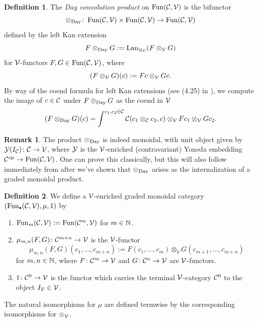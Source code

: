 \documentclass[openany, amssymb, psamsfonts]{amsart}
\theoremstyle{definition}
\newtheorem{defn}{Definition}[section]
\newtheorem{rem}{Remark}[section]
\numberwithin{equation}{section}
\begin{document}
\begin{defn} \label{def:day-conv-prod}
The \emph{Day convolution product} on $\operatorname{Fun}(\mathcal{C}, \mathcal{V})$ is the bifunctor
\begin{equation*}
    \otimes_{\mathrm{Day}} \colon \operatorname{Fun}(\mathcal{C}, \mathcal{V}) \times \operatorname{Fun}(\mathcal{C}, \mathcal{V}) \to \operatorname{Fun}(\mathcal{C}, \mathcal{V})
\end{equation*} defined by the left Kan extension
\begin{equation*}
    F \otimes_{\mathrm{Day}} G := \operatorname{Lan}_{\otimes_{\mathcal{C}}}(F \otimes_{\mathcal{V}} G)
\end{equation*} for $\mathcal{V}$-functors $F, G \in \operatorname{Fun}(\mathcal{C}, \mathcal{V})$, where
\begin{equation*}
    (F \otimes_{\mathcal{V}} G)(c) := Fc \otimes_{\mathcal{V}} Gc.
\end{equation*} By way of the coend formula for left Kan extensions (see (4.25) in \cite{kelly}), we compute the image of $c \in \mathcal{C}$ under $F \otimes_{\mathrm{Day}} G$ as the coend in $\mathcal{V}$
\begin{equation*}
    (F \otimes_{\mathrm{Day}} G)(c) = \int^{c_1, c_2 \in \mathcal{C}} \mathcal{C}(c_1 \otimes_{\mathcal{C}} c_2, c) \otimes_{\mathcal{V}} Fc_1 \otimes_{\mathcal{V}} Gc_2.
\end{equation*}
\end{defn}

\begin{rem}
The product $\otimes_{\mathrm{Day}}$ is indeed monoidal, with unit object given by $\mathcal{Y}(I_{\mathcal{C}}) \colon \mathcal{C} \to \mathcal{V}$, where $\mathcal{Y}$ is the $\mathcal{V}$-enriched (contravariant) Yoneda embedding $\mathcal{C}^{\mathrm{op}} \to \operatorname{Fun}(\mathcal{C}, \mathcal{V})$. One can prove this classically, but this will also follow immediately from  after we've shown that $\otimes_{\mathrm{Day}}$ arises as the internalization of a graded monoidal product.
\end{rem}

\begin{defn}
We define a $\mathcal{V}$-enriched graded monoidal category $(\Fun_\sbull(\C, \V), \mu, 1)$ by
\begin{enumerate}
    \item $\operatorname{Fun}_m(\mathcal{C}, \mathcal{V}) := \operatorname{Fun}(\mathcal{C}^m, \mathcal{V})$ for $m \in \mathbb{N}$.
    \item $\mu_{m, n}(F, G) \colon \mathcal{C}^{m + n} \to \mathcal{V}$ is the $\mathcal{V}$-functor
    \begin{equation*}
        \mu_{m, n}(F, G)(c_1, \dots, c_{m + n}) := F(c_1, \dots, c_m) \otimes_V G(c_{m + 1}, \dots, c_{m + n})
    \end{equation*} for $m, n \in \mathbb{N}$, where $F \colon \mathcal{C}^m \to \mathcal{V}$ and $G \colon \mathcal{C}^n \to \mathcal{V}$ are $\mathcal{V}$-functors.
    \item $1 \colon \mathcal{C}^0 \to \mathcal{V}$ is the functor which carries the terminal $\mathcal{V}$-category $\mathcal{C}^0$ to the object $I_{\mathcal{V}} \in \mathcal{V}$.
\end{enumerate} The natural isomorphisms for $\mu$ are defined termwise by the corresponding isomorphisms for $\otimes_{\mathcal{V}}$.
\end{defn}
\end{document}
